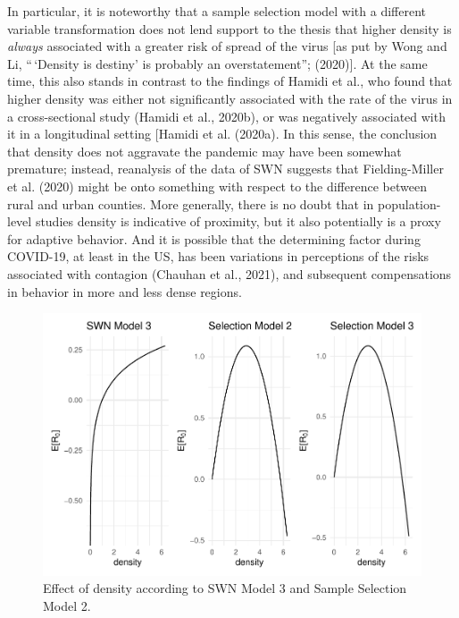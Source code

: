 \documentclass[]{elsarticle} %
\begin{document}
In particular, it is noteworthy that a sample selection model with a
different variable transformation does not lend support to the thesis
that higher density is \emph{always} associated with a greater risk of
spread of the virus {[}as put by Wong and Li, ``\,`Density is destiny'
is probably an overstatement''; (2020){]}. At the same time, this also
stands in contrast to the findings of Hamidi et al., who found that
higher density was either not significantly associated with the rate of
the virus in a cross-sectional study (Hamidi et al., 2020b), or was
negatively associated with it in a longitudinal setting {[}Hamidi et al.
(2020a). In this sense, the conclusion that density does not aggravate
the pandemic may have been somewhat premature; instead, reanalysis of
the data of SWN suggests that Fielding-Miller et al. (2020) might be
onto something with respect to the difference between rural and urban
counties. More generally, there is no doubt that in population-level
studies density is indicative of proximity, but it also potentially is a
proxy for adaptive behavior. And it is possible that the determining
factor during COVID-19, at least in the US, has been variations in
perceptions of the risks associated with contagion (Chauhan et al.,
2021), and subsequent compensations in behavior in more and less dense
regions.

\begin{figure}
\includegraphics[width=1\linewidth]{R0-Density-Reanalysis_files/figure-latex/comparison-results-1} \caption{\label{fig:comparison-results}Effect of density according to SWN Model 3 and Sample Selection Model 2.}\label{fig:comparison-results}
\end{figure}
\end{document}
